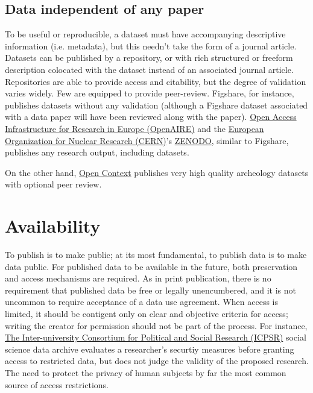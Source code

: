 \documentclass[10pt,twocolumn]{article}
\begin{document}
\subsection*{Data independent of any paper}\label{paper-independent-data}

To be useful or reproducible, a dataset must have accompanying descriptive information (i.e. metadata), but this needn't take the form of a journal article. 
Datasets can be published by a repository, or with rich structured or freeform description colocated with the dataset instead of an associated journal article.
Repositories are able to provide access and citability, but the degree of validation varies widely. 
Few are equipped to provide peer-review. Figshare, for instance, publishes datasets without any validation (although a Figshare dataset associated with a data paper will have been reviewed along with the paper). 
\href{http://www.openaire.eu/en/home}{Open Access Infrastructure for Research in Europe (OpenAIRE)} and the \href{http://home.web.cern.ch/}{European Organization for Nuclear Research (CERN)}'s \href{https://zenodo.org/}{ZENODO}, similar to Figshare, publishes any research output, including datasets.

On the other hand, \href{http://opencontext.org/}{Open Context} publishes very high quality archeology datasets with optional peer review.


\section*{Availability}\label{availability}

To publish is to make public; at its most fundamental, to publish data is to make data public. 
For published data to be available in the future, both preservation and access mechanisms are required.\cite{beagrie_digital_2008, gray_online_2002}
As in print publication, there is no requirement that published data be free or legally unencumbered, and it is not uncommon to require acceptance of a data use agreement.
When access is limited, it should be contigent only on clear and objective criteria for access; writing the creator for permission should not be part of the process.
For instance, \href{http://www.icpsr.umich.edu/icpsrweb/content/deposit/confidentiality.html}{The Inter-university Consortium for Political and Social Research (ICPSR)} social science data archive evaluates a researcher's securtiy measures before granting access to restricted data, but does not judge the validity of the proposed research.
The need to protect the privacy of human subjects by far the most common source of access restrictions.
\end{document}
